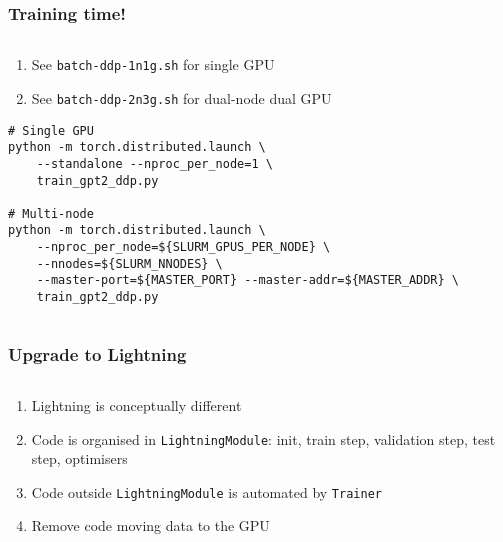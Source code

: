 \documentclass[
	notes=none,
	aspectratio=169
]{beamer}
\begin{document}

\begin{frame}[fragile]
\frametitle{Training time!}

\begin{columns}[T]
\begin{column}[T]{1.0\textwidth}
\setlength{\parskip}{0.5em}

\vspace{0.0cm}
\begin{enumerate}
\setlength{\parskip}{0.5em}
\item See {\tt batch-ddp-1n1g.sh} for single GPU
\item See {\tt batch-ddp-2n3g.sh} for dual-node dual GPU
\end{enumerate}

\begin{lstlisting}[backgroundcolor = \color{darkgray},language=shell]
# Single GPU
python -m torch.distributed.launch \
    --standalone --nproc_per_node=1 \
    train_gpt2_ddp.py

# Multi-node
python -m torch.distributed.launch \
    --nproc_per_node=${SLURM_GPUS_PER_NODE} \
    --nnodes=${SLURM_NNODES} \
    --master-port=${MASTER_PORT} --master-addr=${MASTER_ADDR} \
    train_gpt2_ddp.py
\end{lstlisting}

\end{column}
\end{columns}

\end{frame}
\note{
}


\begin{frame}
\frametitle{Upgrade to Lightning}

\begin{columns}[T]
\begin{column}[T]{1.0\textwidth}
\setlength{\parskip}{0.5em}

\vspace{0.0cm}
\begin{enumerate}
\setlength{\parskip}{0.5em}
\item Lightning is conceptually different
\item Code is organised in {\tt LightningModule}: init, train step, validation step, test step, optimisers
\item Code outside {\tt LightningModule} is automated by {\tt Trainer}
\item Remove code moving data to the GPU
\end{enumerate}

\end{column}
\end{columns}

\end{frame}
\note{
}
\end{document}
